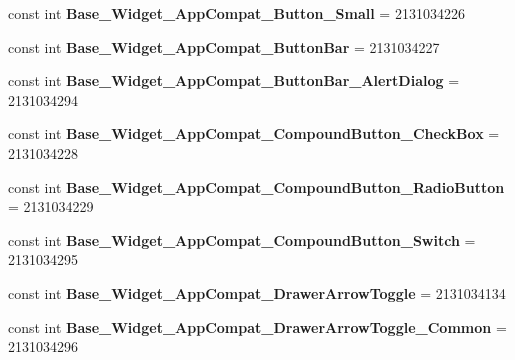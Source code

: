 \begin{DoxyCompactItemize}
\item 
\hypertarget{classClient_1_1Droid_1_1Resource_1_1Style_ad10d6fe5d72fbd496a04dceea1e5d473}{}const int {\bfseries Base\+\_\+\+Widget\+\_\+\+App\+Compat\+\_\+\+Button\+\_\+\+Small} = 2131034226\label{classClient_1_1Droid_1_1Resource_1_1Style_ad10d6fe5d72fbd496a04dceea1e5d473}

\item 
\hypertarget{classClient_1_1Droid_1_1Resource_1_1Style_a775f216e6649bdcefe2df1d3f781c565}{}const int {\bfseries Base\+\_\+\+Widget\+\_\+\+App\+Compat\+\_\+\+Button\+Bar} = 2131034227\label{classClient_1_1Droid_1_1Resource_1_1Style_a775f216e6649bdcefe2df1d3f781c565}

\item 
\hypertarget{classClient_1_1Droid_1_1Resource_1_1Style_a29cac10028b8bfe581ac505bf7948301}{}const int {\bfseries Base\+\_\+\+Widget\+\_\+\+App\+Compat\+\_\+\+Button\+Bar\+\_\+\+Alert\+Dialog} = 2131034294\label{classClient_1_1Droid_1_1Resource_1_1Style_a29cac10028b8bfe581ac505bf7948301}

\item 
\hypertarget{classClient_1_1Droid_1_1Resource_1_1Style_aa33423a4086ed2c111ad4d4b2930f291}{}const int {\bfseries Base\+\_\+\+Widget\+\_\+\+App\+Compat\+\_\+\+Compound\+Button\+\_\+\+Check\+Box} = 2131034228\label{classClient_1_1Droid_1_1Resource_1_1Style_aa33423a4086ed2c111ad4d4b2930f291}

\item 
\hypertarget{classClient_1_1Droid_1_1Resource_1_1Style_abde1e1594d0a343e2773c2e6bb922443}{}const int {\bfseries Base\+\_\+\+Widget\+\_\+\+App\+Compat\+\_\+\+Compound\+Button\+\_\+\+Radio\+Button} = 2131034229\label{classClient_1_1Droid_1_1Resource_1_1Style_abde1e1594d0a343e2773c2e6bb922443}

\item 
\hypertarget{classClient_1_1Droid_1_1Resource_1_1Style_a457e2b3d92b93580a894c1ac8eb99ec4}{}const int {\bfseries Base\+\_\+\+Widget\+\_\+\+App\+Compat\+\_\+\+Compound\+Button\+\_\+\+Switch} = 2131034295\label{classClient_1_1Droid_1_1Resource_1_1Style_a457e2b3d92b93580a894c1ac8eb99ec4}

\item 
\hypertarget{classClient_1_1Droid_1_1Resource_1_1Style_ab977088bac04b82c02830ff3cea4df27}{}const int {\bfseries Base\+\_\+\+Widget\+\_\+\+App\+Compat\+\_\+\+Drawer\+Arrow\+Toggle} = 2131034134\label{classClient_1_1Droid_1_1Resource_1_1Style_ab977088bac04b82c02830ff3cea4df27}

\item 
\hypertarget{classClient_1_1Droid_1_1Resource_1_1Style_aea5d0a27a50a5448908c21ffc6760906}{}const int {\bfseries Base\+\_\+\+Widget\+\_\+\+App\+Compat\+\_\+\+Drawer\+Arrow\+Toggle\+\_\+\+Common} = 2131034296\label{classClient_1_1Droid_1_1Resource_1_1Style_aea5d0a27a50a5448908c21ffc6760906}


\end{DoxyCompactItemize}
